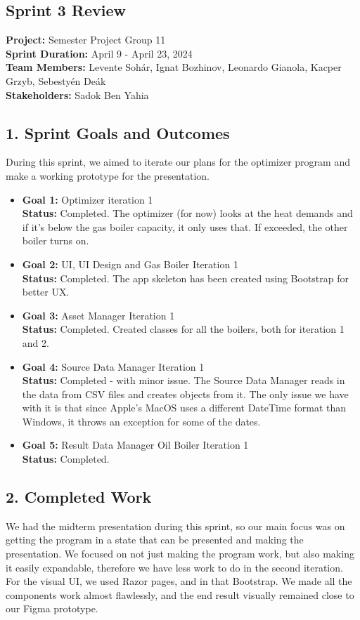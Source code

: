 \documentclass[12pt]{report}
\begin{document}

\subsection*{Sprint 3 Review}
\textbf{Project:} Semester Project Group 11 \\
\textbf{Sprint Duration:} April 9 - April 23, 2024 \\
\textbf{Team Members:} Levente Sohár, Ignat Bozhinov, Leonardo Gianola, Kacper Grzyb, Sebestyén Deák \\
\textbf{Stakeholders:} Sadok Ben Yahia

\subsection*{1. Sprint Goals and Outcomes}
During this sprint, we aimed to iterate our plans for the optimizer program and make a working prototype for the presentation.

\begin{itemize}
    \item \textbf{Goal 1:} Optimizer iteration 1\\
    \textbf{Status:} Completed. The optimizer (for now) looks at the heat demands and if it's below the gas boiler capacity, it only uses that. If exceeded, the other boiler turns on.
    \item \textbf{Goal 2:} UI, UI Design and Gas Boiler Iteration 1\\
    \textbf{Status:} Completed. The app skeleton has been created using Bootstrap for better UX.
    \item \textbf{Goal 3:} Asset Manager Iteration 1\\
    \textbf{Status:} Completed. Created classes for all the boilers, both for iteration 1 and 2.
    \item \textbf{Goal 4:} Source Data Manager Iteration 1\\
    \textbf{Status:} Completed - with minor issue. The Source Data Manager reads in the data from CSV files and creates objects from it. The only issue we have with it is that since Apple's MacOS uses a different DateTime format than Windows, it throws an exception for some of the dates.
    \item \textbf{Goal 5:} Result Data Manager Oil Boiler Iteration 1\\
    \textbf{Status:} Completed.
\end{itemize}

\subsection*{2. Completed Work}
We had the midterm presentation during this sprint, so our main focus was on getting the program in a state that can be presented and making the presentation. We focused on not just making the program work, but also making it easily expandable, therefore we have less work to do in the second iteration. For the visual UI, we used Razor pages, and in that Bootstrap. We made all the components work almost flawlessly, and the end result visually remained close to our Figma prototype.
\end{document}
